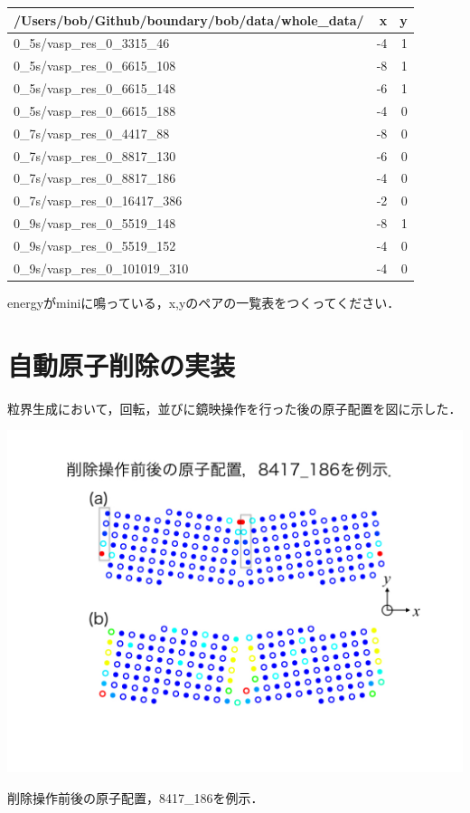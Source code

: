 \begin{longtable}[]{@{}lrr@{}}
\toprule
/Users/bob/Github/boundary/bob/data/whole\_data/ & x & y\tabularnewline
\midrule
\endhead
0\_5s/vasp\_res\_0\_3315\_46 & -4 & 1\tabularnewline
0\_5s/vasp\_res\_0\_6615\_108 & -8 & 1\tabularnewline
0\_5s/vasp\_res\_0\_6615\_148 & -6 & 1\tabularnewline
0\_5s/vasp\_res\_0\_6615\_188 & -4 & 0\tabularnewline
0\_7s/vasp\_res\_0\_4417\_88 & -8 & 0\tabularnewline
0\_7s/vasp\_res\_0\_8817\_130 & -6 & 0\tabularnewline
0\_7s/vasp\_res\_0\_8817\_186 & -4 & 0\tabularnewline
0\_7s/vasp\_res\_0\_16417\_386 & -2 & 0\tabularnewline
0\_9s/vasp\_res\_0\_5519\_148 & -8 & 1\tabularnewline
0\_9s/vasp\_res\_0\_5519\_152 & -4 & 0\tabularnewline
0\_9s/vasp\_res\_0\_101019\_310 & -4 & 0\tabularnewline
\bottomrule
\end{longtable}

energyがminiに鳴っている，x,yのペアの一覧表をつくってください．

    \section{自動原子削除の実装}\label{ux81eaux52d5ux539fux5b50ux524aux9664ux306eux5b9fux88c5}

粒界生成において，回転，並びに鏡映操作を行った後の原子配置を図に示した．

\begin{center}
\includegraphics[width=150mm]{../.././auto_delete/auto_delete.002.jpeg}
\end{center}
削除操作前後の原子配置，8417\_186を例示．

\label{fig:}

